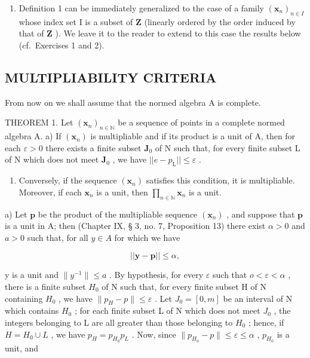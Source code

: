\begin{enumerate}
\def\labelenumi{\arabic{enumi})}
\setcounter{enumi}{1}
\tightlist
\item
  Definition 1 can be immediately generalized to the case of a family \((\pmb{x}_n)_{n\in I}\) whose index set I is a subset of \(\mathbf{Z}\) (linearly ordered by the order induced by that of \(\mathbf{Z}\) ). We leave it to the reader to extend to this case the results below (cf.~Exercises 1 and 2).
\end{enumerate}

\subsection{MULTIPLIABILITY CRITERIA}

From now on we shall assume that the normed algebra A is complete.

THEOREM 1. Let \((\pmb{x}_n)_{n\in \mathbb{N}}\) be a sequence of points in a complete normed algebra A. a) If \((\pmb{x}_n)\) is multipliable and if its product is a unit of A, then for each \(\varepsilon >0\) there exists a finite subset \(\mathbf{J}_0\) of N such that, for every finite subset L of N which does not meet \(\mathbf{J}_0\) , we have \(||e - p_{\mathrm{L}}||\leqslant \varepsilon\) .

\begin{enumerate}
\def\labelenumi{\alph{enumi})}
\setcounter{enumi}{1}
\item
  Conversely, if the sequence \((\pmb{x}_n)\) satisfies this condition, it is multipliable. Moreover, if each \(\pmb{x}_n\) is a unit, then \(\prod_{n\in \mathbb{N}}\pmb{x}_n\) is a unit.
\end{enumerate}

a) Let \(\pmb{p}\) be the product of the multipliable sequence \((\pmb{x}_n)\) , and suppose that \(\pmb{p}\) is a unit in A; then (Chapter IX, § 3, no. 7, Proposition 13) there exist \(\alpha > 0\) and \(a > 0\) such that, for all \(y \in A\) for which we have

\[
\left| \left| \boldsymbol {y} - \boldsymbol {p} \right| \right| \leqslant \alpha ,
\]

y is a unit and \(\|y^{-1}\|\leqslant a\) . By hypothesis, for every \(\varepsilon\) such that \(o<\varepsilon<\alpha\) , there is a finite subset \(H_{0}\) of N such that, for every finite subset H of N containing \(H_{0}\) , we have \(\|p_{H}-p\|\leqslant\varepsilon\) . Let \(J_{0}=[0,m]\) be an interval of N which contains \(H_{0}\) ; for each finite subset L of N which does not meet \(J_{0}\) , the integers belonging to L are all greater than those belonging to \(H_{0}\) ; hence, if \(H=H_{0}\cup L\) , we have \(p_{H}=p_{H_{0}}p_{L}\) . Now, since \(\|p_{H_{0}}-p\|\leqslant\varepsilon\leqslant\alpha\) , \(p_{H_{0}}\) is a unit, and

